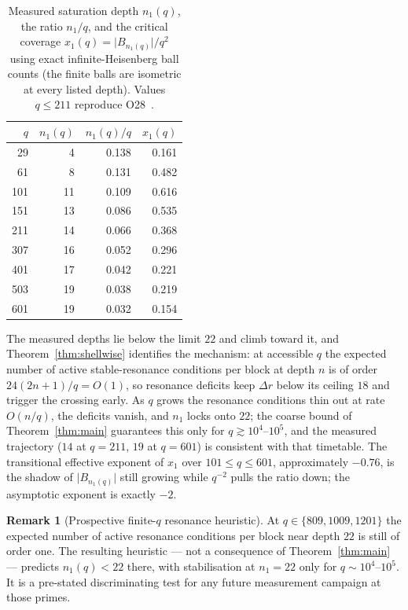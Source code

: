 \documentclass[11pt,a4paper]{article}
\theoremstyle{plain}
\theoremstyle{definition}
\newtheorem{remark}{Remark}
\newcommand{\xone}{x_1}
\newcommand{\none}{n_1}
\begin{document}
    \begin{table}[ht]
      \centering
      \caption{Measured saturation depth $\none(q)$, the ratio $\none/q$, and the critical
        coverage $\xone(q) = \lvert B_{\none(q)}\rvert/q^2$ using exact infinite-Heisenberg ball
        counts (the finite balls are isometric at every listed depth).
        Values $q \le 211$ reproduce O28~\cite{Beau2026a32}.}
      \label{tab:x1}
      \begin{tabular}{rrrr}
        \toprule
        $q$ & $\none(q)$ & $\none(q)/q$ & $\xone(q)$ \\
        \midrule
        29  & 4  & 0.138 & 0.161 \\
        61  & 8  & 0.131 & 0.482 \\
        101 & 11 & 0.109 & 0.616 \\
        151 & 13 & 0.086 & 0.535 \\
        211 & 14 & 0.066 & 0.368 \\
        307 & 16 & 0.052 & 0.296 \\
        401 & 17 & 0.042 & 0.221 \\
        503 & 19 & 0.038 & 0.219 \\
        601 & 19 & 0.032 & 0.154 \\
        \bottomrule
      \end{tabular}
    \end{table}

    The measured depths lie below the limit $22$ and climb toward it, and
    Theorem~\ref{thm:shellwise} identifies the mechanism: at accessible $q$ the expected number of
    active stable-resonance conditions per block at depth $n$ is of order $24(2n+1)/q = O(1)$, so
    resonance deficits keep $\Delta r$ below its ceiling $18$ and trigger the crossing early.
    As $q$ grows the resonance conditions thin out at rate $O(n/q)$, the deficits vanish, and
    $\none$ locks onto $22$; the coarse bound of Theorem~\ref{thm:main} guarantees this only for
    $q \gtrsim 10^4$--$10^5$, and the measured trajectory ($14$ at $q=211$, $19$ at $q=601$) is
    consistent with that timetable.
    The transitional effective exponent of $\xone$ over $101 \le q \le 601$, approximately
    $-0.76$, is the shadow of $\lvert B_{\none(q)}\rvert$ still growing while $q^{-2}$ pulls the
    ratio down; the asymptotic exponent is exactly $-2$.

    \begin{remark}[Prospective finite-$q$ resonance heuristic]
      \label{rem:prediction}
      At $q \in \{809, 1009, 1201\}$ the expected number of active resonance conditions per block
      near depth $22$ is still of order one.
      The resulting heuristic --- not a consequence of Theorem~\ref{thm:main} --- predicts
      $\none(q)<22$ there, with stabilisation at $\none=22$ only for
      $q \sim 10^4$--$10^5$.
      It is a pre-stated discriminating test for any future measurement campaign at those primes.
    \end{remark}
\end{document}
